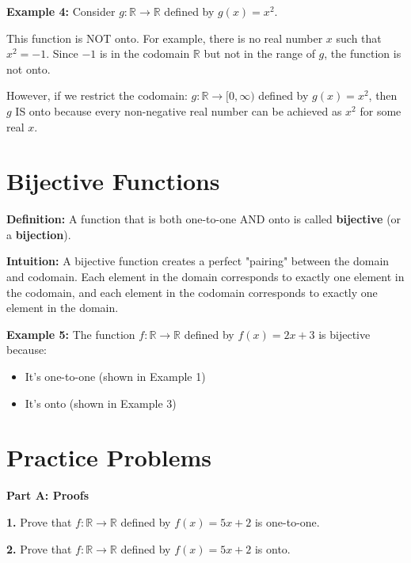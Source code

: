 \documentclass[12pt]{article}
\begin{document}
\textbf{Example 4:} Consider $g: \mathbb{R} \to \mathbb{R}$ defined by $g(x) = x^2$.

This function is NOT onto. For example, there is no real number $x$ such that $x^2 = -1$. Since $-1$ is in the codomain $\mathbb{R}$ but not in the range of $g$, the function is not onto.

However, if we restrict the codomain: $g: \mathbb{R} \to [0, \infty)$ defined by $g(x) = x^2$, then $g$ IS onto because every non-negative real number can be achieved as $x^2$ for some real $x$.

\vspace{1cm}

\newpage

\section{Bijective Functions}

\textbf{Definition:} A function that is both one-to-one AND onto is called \textbf{bijective} (or a \textbf{bijection}).

\vspace{0.7cm}

\textbf{Intuition:} A bijective function creates a perfect "pairing" between the domain and codomain. Each element in the domain corresponds to exactly one element in the codomain, and each element in the codomain corresponds to exactly one element in the domain.

\vspace{0.7cm}

\textbf{Example 5:} The function $f: \mathbb{R} \to \mathbb{R}$ defined by $f(x) = 2x + 3$ is bijective because:
\begin{itemize}
\item It's one-to-one (shown in Example 1)
\item It's onto (shown in Example 3)
\end{itemize}

\section{Practice Problems}

\textbf{Part A: Proofs}

\textbf{1.} Prove that $f: \mathbb{R} \to \mathbb{R}$ defined by $f(x) = 5x + 2$ is one-to-one.
\vspace{4cm}

\textbf{2.} Prove that $f: \mathbb{R} \to \mathbb{R}$ defined by $f(x) = 5x + 2$ is onto.
\vspace{4cm}
\end{document}
